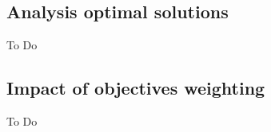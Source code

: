 \subsection{Analysis optimal solutions}\label{subsec:3a}
To Do

\subsection{Impact of objectives weighting}\label{subsec:3b}
To Do
